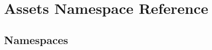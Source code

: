 \hypertarget{namespace_assets}{}\section{Assets Namespace Reference}
\label{namespace_assets}
\subsection*{Namespaces}
\begin{DoxyCompactItemize}
\end{DoxyCompactItemize}
